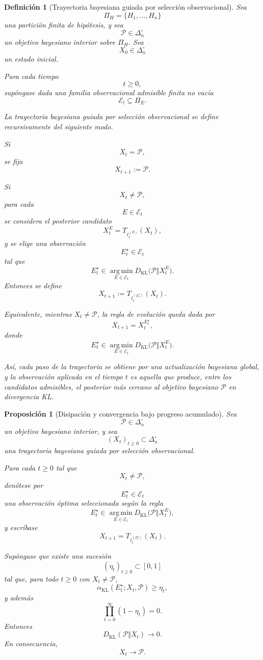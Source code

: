 ﻿\documentclass[12pt]{article}
\newtheorem{definicion}{Definición}[section]
\newtheorem{proposicion}{Proposición}[section]
\begin{document}
\begin{definicion}[Trayectoria bayesiana guiada por selección observacional]
Sea
\[
\Pi_H=\{H_1,\dots,H_n\}
\]
una partición finita de hipótesis, y sea
\[
\mathcal P\in\Delta_n^\circ
\]
un objetivo bayesiano interior sobre \(\Pi_H\). Sea
\[
X_0\in\Delta_n^\circ
\]
un estado inicial.

Para cada tiempo
\[
t\geq 0,
\]
supóngase dada una familia observacional admisible finita no vacía
\[
\mathcal E_t\subseteq \Pi_E.
\]

La \emph{trayectoria bayesiana guiada por selección observacional} se define recursivamente del siguiente modo.

Si
\[
X_t=\mathcal P,
\]
se fija
\[
X_{t+1}:=\mathcal P.
\]

Si
\[
X_t\neq \mathcal P,
\]
para cada
\[
E\in\mathcal E_t
\]
se considera el posterior candidato
\[
X_t^E
=
T_{\ell_t^{(E)}}(X_t),
\]
y se elige una observación
\[
E_t^\star\in\mathcal E_t
\]
tal que
\[
E_t^\star
\in
\operatorname*{arg\,min}_{E\in\mathcal E_t}
D_{\mathrm{KL}}\bigl(\mathcal P\Vert X_t^E\bigr).
\]
Entonces se define
\[
X_{t+1}
:=
T_{\ell_t^{(E_t^\star)}}(X_t).
\]

Equivalente, mientras \(X_t\neq \mathcal P\), la regla de evolución queda dada por
\[
X_{t+1}
=
X_t^{E_t^\star},
\]
donde
\[
E_t^\star
\in
\operatorname*{arg\,min}_{E\in\mathcal E_t}
D_{\mathrm{KL}}\bigl(\mathcal P\Vert X_t^E\bigr).
\]

Así, cada paso de la trayectoria se obtiene por una actualización bayesiana global, y la observación aplicada en el tiempo \(t\) es aquella que produce, entre los candidatos admisibles, el posterior más cercano al objetivo bayesiano \(\mathcal P\) en divergencia KL.
\end{definicion}


\begin{proposicion}[Disipación y convergencia bajo progreso acumulado]
Sea
\[
\mathcal P\in\Delta_n^\circ
\]
un objetivo bayesiano interior, y sea
\[
(X_t)_{t\geq 0}\subset\Delta_n^\circ
\]
una trayectoria bayesiana guiada por selección observacional.

Para cada \(t\geq 0\) tal que
\[
X_t\neq \mathcal P,
\]
denótese por
\[
E_t^\star\in\mathcal E_t
\]
una observación óptima seleccionada según la regla
\[
E_t^\star
\in
\operatorname*{arg\,min}_{E\in\mathcal E_t}
D_{\mathrm{KL}}\bigl(\mathcal P\Vert X_t^E\bigr),
\]
y escríbase
\[
X_{t+1}
=
T_{\ell_t^{(E_t^\star)}}(X_t).
\]

Supóngase que existe una sucesión
\[
(\eta_t)_{t\geq 0}\subset[0,1]
\]
tal que, para todo \(t\geq 0\) con \(X_t\neq \mathcal P\),
\[
\alpha_{\mathrm{KL}}(E_t^\star;X_t,\mathcal P)\geq \eta_t,
\]
y además
\[
\prod_{t=0}^{\infty}(1-\eta_t)=0.
\]
Entonces
\[
D_{\mathrm{KL}}(\mathcal P\Vert X_t)\longrightarrow 0.
\]
En consecuencia,
\[
X_t\longrightarrow \mathcal P.
\]
\end{proposicion}
\end{document}
